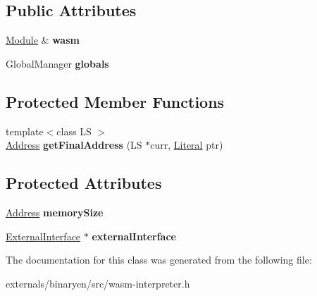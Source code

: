 \subsection*{Public Attributes}
\begin{DoxyCompactItemize}
\item 
\mbox{\label{classwasm_1_1_module_instance_base_a3fa58090eb1b3083ad65c14e4c1dc2ae}} 
\mbox{\hyperlink{classwasm_1_1_module}{Module}} \& {\bfseries wasm}
\item 
\mbox{\label{classwasm_1_1_module_instance_base_a40a40e10ad9f148f7ac7f4c902adec9e}} 
Global\+Manager {\bfseries globals}
\end{DoxyCompactItemize}
\subsection*{Protected Member Functions}
\begin{DoxyCompactItemize}
\item 
\mbox{\label{classwasm_1_1_module_instance_base_a5778c68e67f16b456f13dec67bcfaa56}} 
{\footnotesize template$<$class LS $>$ }\\\mbox{\hyperlink{structwasm_1_1_address}{Address}} {\bfseries get\+Final\+Address} (LS $\ast$curr, \mbox{\hyperlink{classwasm_1_1_literal}{Literal}} ptr)
\end{DoxyCompactItemize}
\subsection*{Protected Attributes}
\begin{DoxyCompactItemize}
\item 
\mbox{\label{classwasm_1_1_module_instance_base_a5bf510f5fda5341dd12acdb6e83841e4}} 
\mbox{\hyperlink{structwasm_1_1_address}{Address}} {\bfseries memory\+Size}
\item 
\mbox{\label{classwasm_1_1_module_instance_base_a7d2909a2aa7068614ac1f3fc8e24ca80}} 
\mbox{\hyperlink{structwasm_1_1_module_instance_base_1_1_external_interface}{External\+Interface}} $\ast$ {\bfseries external\+Interface}
\end{DoxyCompactItemize}


The documentation for this class was generated from the following file\+:\begin{DoxyCompactItemize}
\item 
externals/binaryen/src/wasm-\/interpreter.\+h\end{DoxyCompactItemize}
